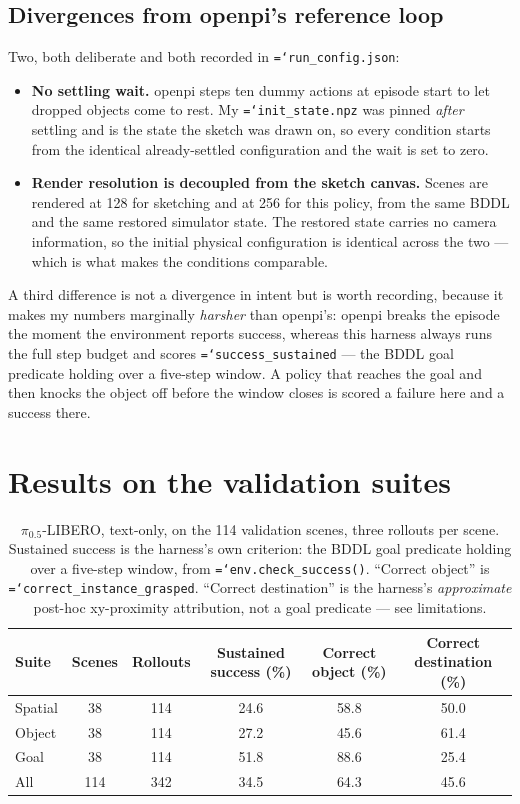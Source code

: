 \documentclass[11pt,a4paper]{article}
\newcommand{\code}[1]{\texttt{\small\hyphenchar\font=`\-\relax #1}}
\begin{document}
\subsection{Divergences from openpi's reference loop}

Two, both deliberate and both recorded in \code{run\_config.json}:

\begin{itemize}
  \item \textbf{No settling wait.} openpi steps ten dummy actions at episode
    start to let dropped objects come to rest. My \code{init\_state.npz} was
    pinned \emph{after} settling and is the state the sketch was drawn on, so
    every condition starts from the identical already-settled configuration and
    the wait is set to zero.
  \item \textbf{Render resolution is decoupled from the sketch canvas.} Scenes
    are rendered at 128 for sketching and at 256 for this policy, from the same
    BDDL and the same restored simulator state. The restored state carries no
    camera information, so the initial physical configuration is identical
    across the two --- which is what makes the conditions comparable.
\end{itemize}

\noindent
A third difference is not a divergence in intent but is worth recording, because
it makes my numbers marginally \emph{harsher} than openpi's: openpi breaks the
episode the moment the environment reports success, whereas this harness always
runs the full step budget and scores \code{success\_sustained} --- the BDDL goal
predicate holding over a five-step window. A policy that reaches the goal and
then knocks the object off before the window closes is scored a failure here and
a success there.

\section{Results on the validation suites}

\begin{table}[h]
\centering
\caption{$\pi_{0.5}$-LIBERO, text-only, on the 114 validation scenes, three
rollouts per scene. Sustained success is the harness's own criterion: the BDDL
goal predicate holding over a five-step window, from
\code{env.check\_success()}. ``Correct object'' is
\code{correct\_instance\_grasped}. ``Correct destination'' is the harness's
\emph{approximate} post-hoc xy-proximity attribution, not a goal predicate ---
see limitations.}
\begin{tabular}{lccccc}
\toprule
Suite & Scenes & Rollouts & Sustained success (\%) & Correct object (\%) & Correct destination (\%) \\
\midrule
Spatial & 38 & 114 & 24.6 & 58.8 & 50.0 \\
Object  & 38 & 114 & 27.2 & 45.6 & 61.4 \\
Goal    & 38 & 114 & 51.8 & 88.6 & 25.4 \\
\midrule
All     & 114 & 342 & 34.5 & 64.3 & 45.6 \\
\bottomrule
\end{tabular}
\end{table}
\end{document}
